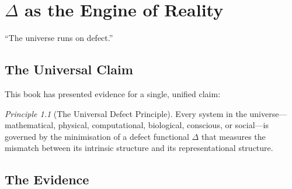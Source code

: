\documentclass[12pt, openany]{book}
\theoremstyle{remark}
\newtheorem{principle}[theorem]{Principle}
\begin{document}
\chapter{$\Delta$ as the Engine of Reality}
\label{ch:reality}

\epigraph{``The universe runs on defect.''}{}

\section{The Universal Claim}

This book has presented evidence for a single, unified claim:

\begin{principle}[The Universal Defect Principle]
\label{prin:universal}
Every system in the universe---mathematical, physical, computational, biological,
conscious, or social---is governed by the minimisation of a defect functional
$\Delta$ that measures the mismatch between its intrinsic structure and its
representational structure.
\end{principle}

\section{The Evidence}
\end{document}
